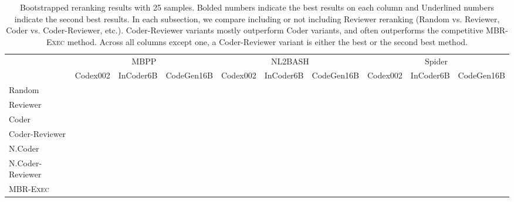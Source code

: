\documentclass[nohyperref]{article}
\theoremstyle{plain}
\theoremstyle{definition}
\theoremstyle{remark}
\begin{document}
\begin{table*}[]
{\begin{tabular}{lccccccccc}
\midrule
{} & \multicolumn{3}{c}{MBPP} & \multicolumn{3}{c}{NL2BASH} & \multicolumn{3}{c}{Spider} \\
\cmidrule(lr){2-4}\cmidrule(lr){5-7}\cmidrule(lr){8-10}
{} &            Codex002 &           InCoder6B &          CodeGen16B &            Codex002 &           InCoder6B &          CodeGen16B &            Codex002 &           InCoder6B &          CodeGen16B \\
\midrule
Random            &               &               &               &               &               &               &               &               &               \\
Reviewer          &      &               &               &   &   &               &               &               &               \\
\midrule
Coder             &               &               &               &               &               &               &               &               &      \\
Coder-Reviewer    &   &   &   &               &               &   &   &      &   \\
\midrule
N.Coder           &               &               &               &               &               &      &               &               &               \\
N.Coder-Reviewer  &               &               &               &      &      &               &               &   &               \\
\midrule
MBR-\textsc{Exec} &               &      &      &               &               &               &      &               &               \\
\bottomrule
\end{tabular}







 }
\vspace{-5pt}
\caption{Bootstrapped reranking results with 25 samples. 
Bolded numbers indicate the best results on each column and Underlined numbers indicate the second best results.
In each subsection, we compare including or not including Reviewer reranking (Random vs. Reviewer, Coder vs. Coder-Reviewer, etc.).
Coder-Reviewer variants mostly outperform Coder variants, and often outperforms the competitive MBR-\textsc{Exec} method.
Across all columns except one, a Coder-Reviewer variant is either the best or the second best method.
}

\label{tab:main_table}
\vspace{-10pt}
\end{table*}
\end{document}
